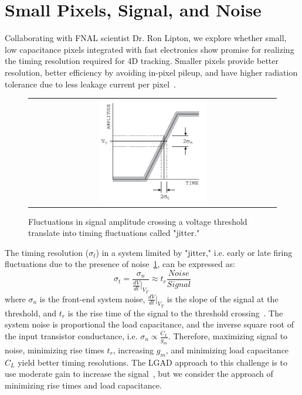 \section{Small Pixels, Signal, and Noise}
Collaborating with FNAL scientist Dr. Ron Lipton, we explore whether small, low capacitance pixels integrated with fast electronics show promise for realizing the timing resolution required for 4D tracking.
Smaller pixels provide better resolution, better efficiency by avoiding in-pixel pileup, and have higher radiation tolerance due to less leakage current per pixel~\cite{Garcia-Sciveres_2018}.

\begin{figure}[!h]
  \begin{center}
    \begin{tabular}{c}
        \includegraphics[width=0.45\textwidth]{fig_FastTiming/Jitter.png}
    \end{tabular}
    \caption{Fluctuations in signal amplitude crossing a voltage threshold translate into timing fluctuations called "jitter."
            }            
    \label{Jitter}
  \end{center}
\end{figure}
The timing resolution ($\sigma_t$) in a system limited by "jitter," i.e. early or late firing fluctuations due to the presence of noise~\ref{Jitter}, can be expressed as:
\begin{equation}
\sigma_t =\frac{\sigma_n}{\frac{d V}{d t}\vert_{V_T}} \approx t_r\frac{Noise}{Signal}
\end{equation}
where $\sigma_n$ is the front-end system noise, $\frac{d V}{d t}\vert_{V_T}$ is the slope of the signal at the threshold, and $t_r$ is the rise time of the signal to the threshold crossing~\cite{4336333}.
The system noise is proportional the load capacitance, and the inverse square root of the input transistor conductance, i.e. $\sigma_n \propto \frac{C_L}{g_m}$.
Therefore, maximizing signal to noise, minimizing rise times $t_r$, increasing $g_m$, and minimizing load capacitance $C_L$ yield better timing resolutions.
The LGAD approach to this challenge is to use moderate gain to increase the signal~\cite{SADROZINSKI2013226}, but we consider the approach of minimizing rise times and load capacitance.

